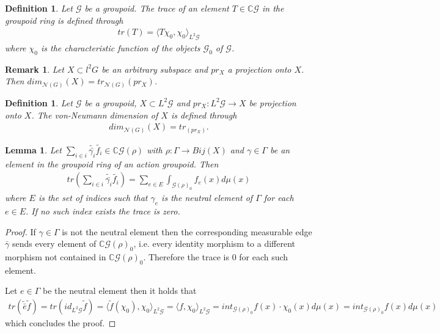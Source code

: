\documentclass[12pt,a4paper]{scrartcl}
\newtheorem{Definition}[Theorem]{Definition}
\newtheorem{Lemma}[Theorem]{Lemma}
\newtheorem{Remark}[Theorem]{Remark}
\numberwithin{equation}{section}
\newcommand{\C}{\mathbb{C}} %
\newcommand{\2}{\mathbb{Z} / 2 \mathbb{Z}}
\newcommand{\G}{\mathcal{G}}
\newcommand{\1}{\bar{1}}
\newcommand{\0}{\bar{0}}
\begin{document}
\begin{Definition}
	Let $\G$ be a groupoid. The trace of an element $T \in \C \G$ in the groupoid ring is defined through
	\begin{align*}
		tr(T) = \langle T \chi_0, \chi_0 \rangle_{L^2 \G}
	\end{align*}
	where $\chi_0$ is the characteristic function of the objects $\G_0$ of $\G$.
\end{Definition}
\begin{Remark}
	Let $X \subset l^2G$ be an arbitrary subspace and $pr_X$ a projection onto $X$. Then $dim_{\mathcal{N}(G)}(X) = tr_{\mathcal{N}(G)}(pr_X)$.
\end{Remark}
\begin{Definition}
	Let $\G$ be a groupoid, $X \subset L^2 \G$ and $pr_X: L^2 \G \to X$ be projection onto $X$. The von-Neumann dimension of $X$ is defined through
	\begin{align*}
		dim_{\mathcal{N}(G)}(X) = tr_(pr_X).
	\end{align*}
\end{Definition}
\begin{Lemma} \label{trgroupoid}
	Let $\sum_{i \in i} \tilde{\bar{\gamma_i}} \tilde{f_i} \in \C\G(\rho)$ with $\rho: \Gamma \to Bij(X)$ and $\gamma \in \Gamma$ be an element in the groupoid ring of an action groupoid. Then
	\begin{align*}
		tr(\sum_{i \in i} \tilde{\bar{\gamma_i}} \tilde{f_i}) = \sum_{e \in E} \int_{\G(\rho)_0} f_e(x) d\mu(x)
	\end{align*}
	where $E$ is the set of indices such that $\gamma_e$ is the neutral element of $\Gamma$ for each $e \in E$. If no such index exists the trace is zero.
\end{Lemma}
\begin{proof} 
	If $\gamma \in \Gamma$ is not the neutral element then the corresponding measurable edge $\bar{\gamma}$ sends every element of $\C\G(\rho)_0$, i.e. every identity morphism to a different morphism not contained in $\C\G(\rho)_0$. Therefore the trace is $0$ for each such element.
	
	Let $e \in \Gamma$ be the neutral element then it holds that
	\begin{align*}
		tr(\tilde{\bar{e}} \tilde{f}) = tr(id_{L^2 \G} \tilde{f}) = \langle \tilde{f} (\chi_0), \chi_0 \rangle_{L^2 \G} = \langle f, \chi_0 \rangle_{L^2 \G} = int_{\G(\rho)_0} f(x) \cdot \chi_0(x) d\mu(x) = int_{\G(\rho)_0} f(x) d\mu(x)
	\end{align*}
	which concludes the proof.
\end{proof}
\end{document}
